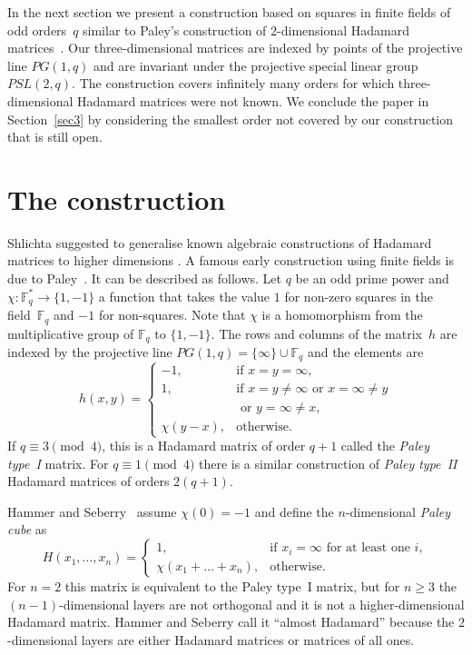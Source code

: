 \documentclass[12pt, reqno]{amsart}
\def\F{\mathbb{F}}
\begin{document}
In the next section we present a construction based on squares in finite fields
of odd orders~$q$ similar to Paley's construction of $2$-dimensional Hadamard
matrices~\cite{RP33}. Our three-dimensional matrices are indexed by points of
the projective line $PG(1,q)$ and are invariant under the projective special
linear group $PSL(2,q)$. The construction covers infinitely many orders for
which three-dimensional Hadamard matrices were not known. We conclude the paper
in Section~\ref{sec3} by considering the smallest order not covered by our
construction that is still open.


\section{The construction}\label{sec2}

Shlichta suggested to generalise known algebraic constructions of
Hadamard matrices to higher dimensions \cite[Section VI, Problem~(a)]{PS79}.
A famous early construction using finite fields is due to Paley~\cite{RP33}.
It can be described as follows. Let $q$ be an odd prime power and
$\chi:\F_q^*\to \{1,-1\}$ a function that takes the value $1$ for non-zero
squares in the field~$\F_q$ and $-1$ for non-squares. Note that $\chi$
is a homomorphism from the multiplicative group of $\F_q$ to $\{1,-1\}$.
The rows and columns of the matrix~$h$ are indexed by the projective line
$PG(1,q)=\{\infty\}\cup \F_q$ and the elements are
\begin{equation}\label{paley}
h(x,y)=\left\{\begin{array}{ll}
-1, & \mbox{if } x=y=\infty,\\
1, & \mbox{if } x=y\neq \infty \mbox{ or } x=\infty\neq y \\
 & \mbox{ or } y=\infty\neq x,\\
\chi(y-x), & \mbox{otherwise.}
\end{array}\right.
\end{equation}
If $q\equiv 3 \pmod{4}$, this is a Hadamard matrix of order $q+1$ called
the \emph{Paley type~I} matrix. For $q\equiv 1 \pmod{4}$ there is a similar
construction of \emph{Paley type~II} Hadamard matrices of orders $2(q+1)$.

Hammer and Seberry~\cite[Example~2]{HS81} assume $\chi(0)=-1$ and
define the $n$-dimensional \emph{Paley cube} as
$$H(x_1,\ldots,x_n)=\left\{\begin{array}{ll}
1, & \mbox{if } x_i=\infty \mbox{ for at least one } i,\\
\chi(x_1+\ldots+x_n), & \mbox{otherwise.}
\end{array}\right.$$
For $n=2$ this matrix is equivalent to the Paley type~I matrix, but for
$n\ge 3$ the $(n-1)$-dimensional layers are not orthogonal and it is not
a higher-dimensional Hadamard matrix. Hammer and Seberry call it ``almost
Hadamard'' because the $2$-dimensional layers are either Hadamard matrices
or matrices of all ones.
\end{document}
